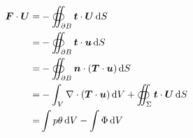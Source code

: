 \documentclass[12pt]{article}
\begin{document}
\begin{equation}
	\begin{split}
		\bm{F}\cdot \bm{U} = & - \oiint_{\partial B} \bm{t}\cdot \bm{U} \dif S\\
		= & - \oiint_{\partial B} \bm{t}\cdot \bm{u} \dif S\\
		= & - \oiint_{\partial B} \bm{n}\cdot(\bm{T}\cdot \bm{u}) \dif S\\
		= & - \int_{V} \nabla \cdot (\bm{T}\cdot \bm{u}) \dif V + \oiint_{\Sigma} \bm{t} \cdot \bm{U} \dif S\\
		= & \int p \theta \dif V - \int \Phi \dif V
	\end{split}
\end{equation}













\nocite{*}


\end{document}
